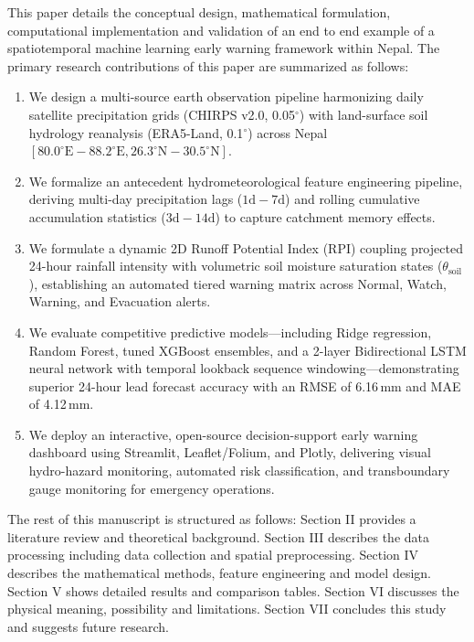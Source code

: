 \documentclass[journal]{IEEEtran}
\begin{document}
This paper details the conceptual design, mathematical formulation, computational implementation and validation of an end to end example of a spatiotemporal machine learning early warning framework within Nepal. The primary research contributions of this paper are summarized as follows:
\begin{enumerate}
    \item We design a multi-source earth observation pipeline harmonizing daily satellite precipitation grids (CHIRPS v2.0, 0.05$^\circ$) with land-surface soil hydrology reanalysis (ERA5-Land, 0.1$^\circ$) across Nepal $[80.0^\circ\text{E} - 88.2^\circ\text{E}, 26.3^\circ\text{N} - 30.5^\circ\text{N}]$.
    \item We formalize an antecedent hydrometeorological feature engineering pipeline, deriving multi-day precipitation lags ($1\text{d}-7\text{d}$) and rolling cumulative accumulation statistics ($3\text{d}-14\text{d}$) to capture catchment memory effects.
    \item We formulate a dynamic 2D Runoff Potential Index (RPI) coupling projected 24-hour rainfall intensity with volumetric soil moisture saturation states ($\theta_{\text{soil}}$), establishing an automated tiered warning matrix across Normal, Watch, Warning, and Evacuation alerts.
    \item We evaluate competitive predictive models---including Ridge regression, Random Forest, tuned XGBoost ensembles, and a 2-layer Bidirectional LSTM neural network with temporal lookback sequence windowing---demonstrating superior 24-hour lead forecast accuracy with an RMSE of 6.16\,mm and MAE of 4.12\,mm.
    \item We deploy an interactive, open-source decision-support early warning dashboard using Streamlit, Leaflet/Folium, and Plotly, delivering visual hydro-hazard monitoring, automated risk classification, and transboundary gauge monitoring for emergency operations.
\end{enumerate}

The rest of this manuscript is structured as follows: Section II provides a literature review and theoretical background. Section III describes the data processing including data collection and spatial preprocessing. Section IV describes the mathematical methods, feature engineering and model design. Section V shows detailed results and comparison tables. Section VI discusses the physical meaning, possibility and limitations. Section VII concludes this study and suggests future research.
\end{document}
